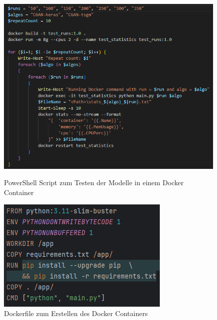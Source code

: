 \begin{figure}[ht]
    \centering
    \begin{minipage}{0.6\textwidth}
        \centering
        \includegraphics[width=\textwidth]{includes/figures/code/powershell_for_testing.png}
        \caption{PowerShell Script zum Testen der Modelle in einem Docker Container}
        \label{fig:test_run_powershell}
    \end{minipage}\hfill
    \begin{minipage}{0.38\textwidth}
        \centering
        \includegraphics[width=\textwidth]{includes/figures/code/Dockerfile_for_testing.png}
        \caption{Dockerfile zum Erstellen des Docker Containers}
        \label{fig:test_run_dockerfile}
    \end{minipage}
\end{figure}

